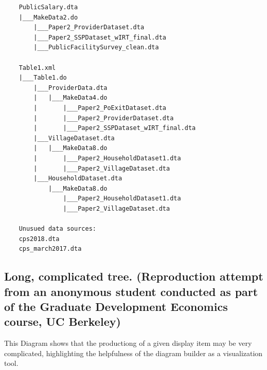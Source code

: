 \documentclass[]{book}
\begin{document}
\begin{verbatim}
    PublicSalary.dta
    |___MakeData2.do
        |___Paper2_ProviderDataset.dta
        |___Paper2_SSPDataset_wIRT_final.dta
        |___PublicFacilitySurvey_clean.dta
    
    Table1.xml
    |___Table1.do
        |___ProviderData.dta
        |   |___MakeData4.do
        |       |___Paper2_PoExitDataset.dta
        |       |___Paper2_ProviderDataset.dta
        |       |___Paper2_SSPDataset_wIRT_final.dta
        |___VillageDataset.dta
        |   |___MakeData8.do
        |       |___Paper2_HouseholdDataset1.dta
        |       |___Paper2_VillageDataset.dta
        |___HouseholdDataset.dta
            |___MakeData8.do
                |___Paper2_HouseholdDataset1.dta
                |___Paper2_VillageDataset.dta
    
    Unusued data sources:
    cps2018.dta
    cps_march2017.dta  
\end{verbatim}

\hypertarget{long-complicated-tree.-reproduction-attempt-from-an-anonymous-student-conducted-as-part-of-the-graduate-development-economics-course-uc-berkeley}{%
\subsection{Long, complicated tree. (Reproduction attempt from an anonymous student conducted as part of the Graduate Development Economics course, UC Berkeley)}\label{long-complicated-tree.-reproduction-attempt-from-an-anonymous-student-conducted-as-part-of-the-graduate-development-economics-course-uc-berkeley}}

This Diagram shows that the productiong of a given display item may be very complicated, highlighting the helpfulness of the diagram builder as a visualization tool.
\end{document}
